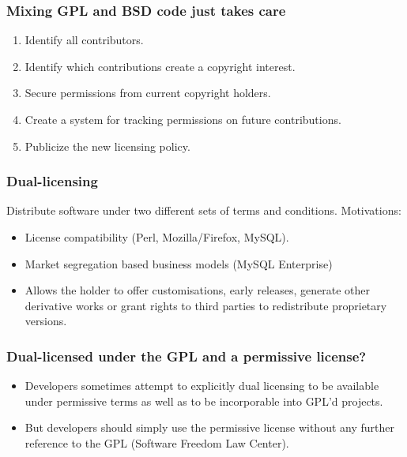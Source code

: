 \documentclass{beamer}
\begin{document}
\begin{frame}
\frametitle{Mixing GPL and BSD code just takes care}

\begin{enumerate}
\item Identify all contributors.
\item Identify which contributions create a copyright interest.
\item Secure permissions from current copyright holders.
\item Create a system for tracking permissions on future contributions.
\item Publicize the new licensing policy.
\end{enumerate}
                                                 
\end{frame}


\begin{frame}
\frametitle{Dual-licensing}

Distribute software under two different sets of terms and conditions. Motivations:

\begin{itemize}
\item License compatibility (Perl, Mozilla/Firefox, MySQL).
\item Market segregation based business models (MySQL Enterprise)
\item Allows the holder to offer customisations, early releases, generate other derivative works or grant rights to third parties to redistribute proprietary versions.
\end{itemize}
                                                 
\end{frame}

\begin{frame}
\frametitle{Dual-licensed under the GPL and a permissive license?}

\begin{itemize}
\item Developers sometimes attempt to explicitly dual licensing to be available under permissive terms as well as to be incorporable into GPL'd projects.
\item But developers should simply use the permissive license without any further reference to the GPL (Software Freedom Law Center).
\end{itemize}
                                                 
\end{frame}
\end{document}
